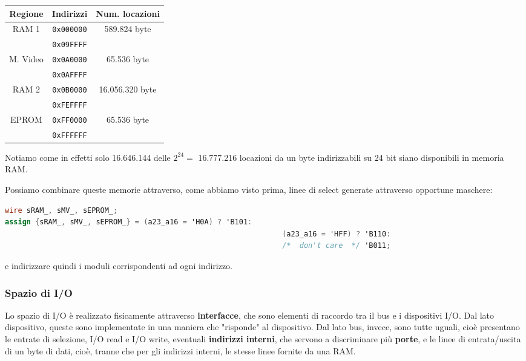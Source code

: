 \documentclass[a4paper,11pt]{article}
\begin{document}
\begin{table}[h!]
	\center {}
	\begin{tabular} { c | c | c }
		\bfseries Regione & \bfseries Indirizzi & \bfseries Num. locazioni \\
		\hline 
		RAM 1 & \lstinline|0x000000| & 589.824 byte \\
					& \lstinline|0x09FFFF| & \\	
		\hline
		M. Video & \lstinline|0x0A0000| & 65.536 byte \\
						 & \lstinline|0x0AFFFF| & \\	
		\hline
		RAM 2 & \lstinline|0x0B0000| & 16.056.320 byte \\
					& \lstinline|0xFEFFFF| & \\	
		\hline
		EPROM & \lstinline|0xFF0000| & 65.536 byte \\
					& \lstinline|0xFFFFFF| & \\
	\end{tabular}
\end{table}

Notiamo come in effetti solo 16.646.144 delle $2^{24} =$ 16.777.216 locazioni da un byte indirizzabili su 24 bit siano disponibili in memoria RAM.  

Possiamo combinare queste memorie attraverso, come abbiamo visto prima, linee di select generate attraverso opportune maschere:
\begin{lstlisting}[language=verilog, style=codestyle]	
wire sRAM_, sMV_, sEPROM_;
assign {sRAM_, sMV_, sEPROM_} = (a23_a16 = 'H0A) ? 'B101:
																(a23_a16 = 'HFF) ? 'B110:
																/* 	don't care	*/ 'B011;
\end{lstlisting}
e indirizzare quindi i moduli corrispondenti ad ogni indirizzo.

\subsubsection{Spazio di I/O}
Lo spazio di I/O è realizzato fisicamente attraverso \textbf{interfacce}, che sono elementi di raccordo tra il bus e i dispositivi I/O.
Dal lato dispositivo, queste sono implementate in una maniera che "risponde" al dispositivo.
Dal lato bus, invece, sono tutte uguali, cioè presentano le entrate di selezione, I/O read e I/O write, eventuali \textbf{indirizzi interni}, che servono a discriminare più \textbf{porte}, e le linee di entrata/uscita di un byte di dati, cioè, tranne che per gli indirizzi interni, le stesse linee fornite da una RAM.
\end{document}
